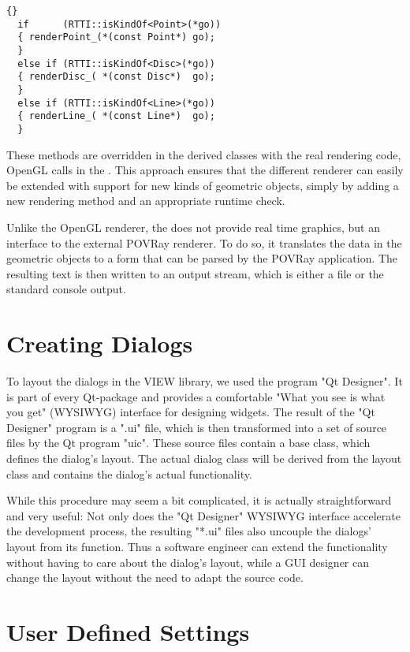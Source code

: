 \begin{lstlisting}{}
  if      (RTTI::isKindOf<Point>(*go))
  { renderPoint_(*(const Point*) go);
  }
  else if (RTTI::isKindOf<Disc>(*go))
  { renderDisc_( *(const Disc*)  go);
  }
  else if (RTTI::isKindOf<Line>(*go))
  { renderLine_( *(const Line*)  go);
  }
\end{lstlisting}

\noindent 
These methods are overridden in the derived classes with the real rendering
code, \eg OpenGL calls in the . This approach ensures that 
the different renderer can easily be extended with support for new kinds of 
geometric objects, simply by adding a new rendering method and an appropriate 
runtime check.

Unlike the OpenGL renderer, the  does not provide real 
time graphics, but an interface to the external POVRay renderer. To do so, it 
translates the data in the geometric objects to a form that can be parsed by 
the POVRay application. The resulting text is then written to an output stream,
which is either a file or the standard console output.


\section{Creating Dialogs}
\label{designer}

To layout the dialogs in the VIEW library, we used the program "Qt Designer".
It is part of every Qt-package and provides a comfortable "What you see is what
you get" (WYSIWYG) interface for designing widgets. The result of the "Qt 
Designer" program is a ".ui" file, which is then transformed into a set of \CPP
source files by the Qt program "uic". These source files contain a base class, 
which defines the dialog's layout. The actual dialog class will be derived from
the layout class and contains the dialog's actual functionality.

While this procedure may seem a bit complicated, it is actually straightforward
and very useful: Not only does the "Qt Designer" WYSIWYG interface accelerate 
the development process, the resulting "*.ui" files also uncouple the dialogs' 
layout from its function. Thus a software engineer can extend the functionality
without having to care about the dialog's layout, while a GUI designer can 
change the layout without the need to adapt the source code.


\section{User Defined Settings}
\label{preferences}

